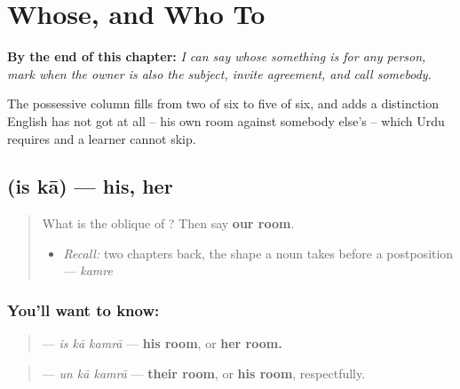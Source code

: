 
\chapter{Whose, and Who To}
\label{ch:ur-whose-and-who-to}

\begin{chapteropening}
\textbf{By the end of this chapter:} \emph{I can say whose something is for any person, mark when the owner is also the subject, invite agreement, and call somebody.}

The possessive column fills from two of six to five of six, and  adds a distinction English has not got at all -- his own room against somebody else's -- which Urdu requires and a learner cannot skip.
\end{chapteropening}

\section[\texorpdfstring{\ur{اس} \ur{کا} (is kā)}{اس کا (is kā)}]{  (is kā) — his, her}

\label{lesson:UR-C26-is-ka}



\begin{quote}
What is the oblique of \textbf{}? Then say \textbf{our room}.

\begin{itemize}
\raggedright
  \item \emph{Recall:} two chapters back, the shape a noun takes before a postposition — \emph{kamre}
\end{itemize}
\end{quote}

\subsection*{You'll want to know:  }
\begin{quote}
\textbf{  } — \emph{is kā kamrā} — \textbf{his room}, or \textbf{her room.}
\end{quote}

\begin{quote}
\textbf{  } — \emph{un kā kamrā} — \textbf{their room}, or \textbf{his room}, respectfully.
\end{quote}


